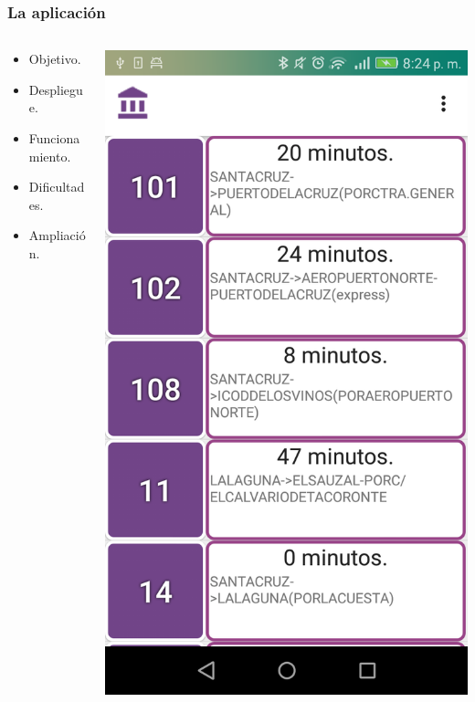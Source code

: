 \begin{frame}
	\frametitle{La aplicación \BulletPoint{}}
	\begin{columns}
		\begin{column}{0.6\textwidth}
			\begin{itemize}
				\item Objetivo.
				\item Despliegue.
				\item Funcionamiento.
				\item Dificultades.
				\item Ampliación.
			\end{itemize}
			\endblock{}
		\end{column}
		\begin{column}{0.4\textwidth}
			\vfill 
			\begin{center}
				\includegraphics[width=0.8\linewidth]{Images/App/Autobuses}
			\end{center}
		\end{column}
	\end{columns}
\end{frame}

